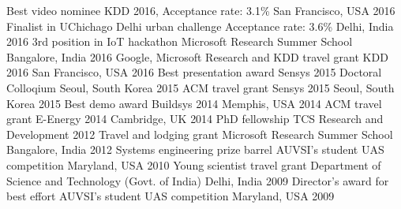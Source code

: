
\begin{cvhonors}
	 \cvhonor
	 {Best video nominee}
	 {KDD 2016, Acceptance rate: 3.1\%}
	 {San Francisco, USA}
	 {2016}
 \cvhonor
 {Finalist in UChichago Delhi urban challenge}
 {Acceptance rate: 3.6\%}
 {Delhi, India}
 {2016}
 \cvhonor
 {3rd position in IoT hackathon}
 {Microsoft Research Summer School}
 {Bangalore, India}
 {2016}
  \cvhonor
  {Google, Microsoft Research and KDD travel grant}
  {KDD 2016}
  {San Francisco, USA}
  {2016}
  \cvhonor
    {Best presentation award}
    {Sensys 2015 Doctoral Colloqium}
    {Seoul, South Korea}
    {2015}
  \cvhonor
    {ACM travel grant}
    {Sensys 2015}
    {Seoul, South Korea}
    {2015}
  \cvhonor
    {Best demo award}
    {Buildsys 2014}
    {Memphis, USA}
    {2014}
  \cvhonor
    {ACM travel grant}
    {E-Energy 2014}
    {Cambridge, UK}
    {2014}
  \cvhonor
    {PhD fellowship}
    {TCS Research and Development}
    {}
    {2012}
  \cvhonor
    {Travel and lodging grant}
    {Microsoft Research Summer School}
    {Bangalore, India}
    {2012}
  \cvhonor
  {Systems engineering prize barrel}
  {AUVSI's student UAS competition}
  {Maryland, USA}
  {2010}
   \cvhonor
   {Young scientist travel grant}
   {Department of Science and Technology (Govt. of India) }
   {Delhi, India}
   {2009}
     \cvhonor
     {Director’s award for best effort}
     {AUVSI's student UAS competition }
   {Maryland, USA}
   {2009}
\end{cvhonors}
